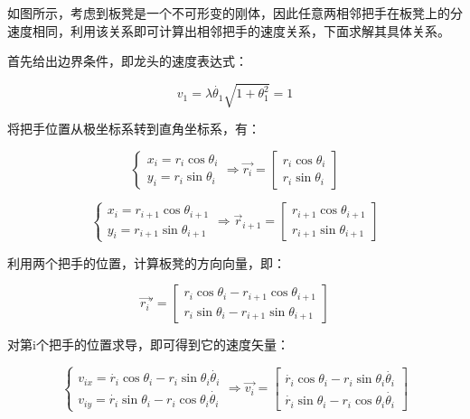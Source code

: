 \documentclass[withoutpreface,bwprint]{cumcmthesis}
\begin{document}
如图所示，考虑到板凳是一个不可形变的刚体，因此任意两相邻把手在板凳上的分速度相同，利用该关系即可计算出相邻把手的速度关系，下面求解其具体关系。

首先给出边界条件，即龙头的速度表达式：

$$
v_{1}=\lambda\dot{\theta_1 }  \sqrt{1+\theta_{1} ^{2}  } =1
$$

将把手位置从极坐标系转到直角坐标系，有：

\begin{equation}
\label{eq:公式7}
\begin{cases}x_{i}=r_{i} \cos \theta _{i}  \\y_{i}=r_{i} \sin \theta _{i} \end{cases}\Rightarrow \overrightarrow{r_{i} } =\begin{bmatrix}r_{i} \cos \theta _{i} \\ r_{i} \sin \theta _{i}\end{bmatrix} 
\end{equation}

\begin{equation}
\label{eq:公式8}
\begin{cases}x_{i}=r_{i+1} \cos \theta _{i+1}  \\y_{i}=r_{i+1} \sin \theta _{i+1} \end{cases}\Rightarrow \overrightarrow{r }_{i+1} =\begin{bmatrix}r_{i+1} \cos \theta _{i+1}  \\ r_{i+1} \sin \theta _{i+1}\end{bmatrix} 
\end{equation}

利用两个把手的位置，计算板凳的方向向量，即：

\begin{equation}
\label{eq:公式9}
{\overrightarrow{{r_{i}}}}'=\begin{bmatrix}r_{i} \cos \theta _{i}-r_{i+1} \cos \theta _{i+1} \\r_{i} \sin \theta _{i}-r_{i+1} \sin \theta _{i+1}\end{bmatrix}
\end{equation}

对第i个把手的位置求导，即可得到它的速度矢量：

\begin{equation}
\label{eq:公式10}
\left\{\begin{matrix}v_{ix}=\dot{r_{i }}\cos \theta _{i} -r_{i }\sin \theta _{i}\dot{\theta _{i} }  \\v_{iy}=\dot{r_{i }}\sin \theta _{i} -r_{i }\cos\theta _{i}\dot{\theta _{i} }\end{matrix}\right.\Rightarrow \overrightarrow{v_{i} } =\begin{bmatrix}\dot{r_{i }}\cos \theta _{i} -r_{i }\sin \theta _{i}\dot{\theta _{i} }  \\ \dot{r_{i }}\sin \theta _{i} -r_{i }\cos\theta _{i}\dot{\theta _{i} }\end{bmatrix}
\end{equation}
\end{document}
